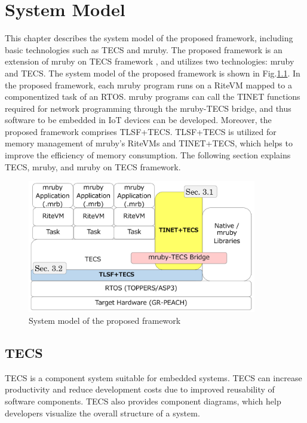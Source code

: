 \documentclass[a4j,12pt,oneside,openany,english]{jsbook}
\begin{document}
\chapter{System Model}
\label{sec:System Model}

This chapter describes the system model of the proposed framework, including basic technologies such as TECS and mruby.
The proposed framework is an extension of mruby on TECS framework \cite{par:mrubyonTECS}\cite{par:mrubyonTECS3}, and utilizes two technologies: mruby and TECS.
The system model of the proposed framework is shown in Fig.\ref{fig:SystemModel}.
In the proposed framework, each mruby program runs on a RiteVM mapped to a componentized task of an RTOS.
mruby programs can call the TINET functions required for network programming through the mruby-TECS bridge, and thus software to be embedded in IoT devices can be developed.
Moreover, the proposed framework comprises TLSF+TECS.
TLSF+TECS is utilized for memory management of mruby's RiteVMs and TINET+TECS, which helps to improve the efficiency of memory consumption.
The following section explains TECS, mruby, and mruby on TECS framework.


\begin{figure}[t]
    \centering
    \includegraphics[width=10cm,clip]{figure/SystemModel.pdf}
    \caption{System model of the proposed framework}
    \label{fig:SystemModel}
\end{figure}

\section{TECS}
\label{sec:TECS}

TECS is a component system suitable for embedded systems.
TECS can increase productivity and reduce development costs due to improved reusability of software components.
TECS also provides component diagrams, which help developers visualize the overall structure of a system.
\end{document}
